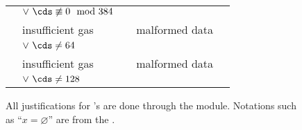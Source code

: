 \begin{figure}[!h]
\begin{tabular}{|l||l|c|l|c|}
                                                  & $\vee~\cds \not \equiv 0 \mod 384$             &                           &                                                                   &                                                  \\ \cline{1-4}
		\instBlsMapFpToGOne{}             & insufficient gas                               & \multirow{2}{*}{\toOob}   & malformed data                                                    &                                                  \\
                                                  & $\vee~\cds \neq  64$                           &                           &                                                                   &                                                  \\ \cline{1-4}
		\instBlsMapFpTwoToGTwo{}          & insufficient gas                               & \multirow{2}{*}{\toOob}   & malformed data                                                    &                                                  \\
                                                  & $\vee~\cds \neq 128$                           &                           &                                                                   &                                                  \\ \hline
	\end{tabular}
	\label{hub: instruction handling: call: precompiles: table classifying failures known to the HUB vs. to RAM}
	\caption{All justifications for \scenPrcFailureKnownToHub{}'s are done through the \oobMod{} module. Notations such as ``$x = \varnothing$'' are from the \cite{EYP-London}.}
\end{figure}

